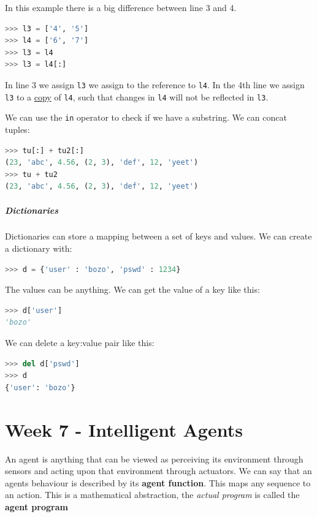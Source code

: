 \documentclass{article}
\begin{document}
In this example there is a big difference between line 3 and 4.
\begin{lstlisting}[inputencoding=utf8/latin1,basicstyle=\ttfamily,
language=python, keywordstyle=\color{blue}\bfseries, rulecolor=\color{black}]
>>> l3 = ['4', '5']
>>> l4 = ['6', '7']
>>> l3 = l4
>>> l3 = l4[:]
\end{lstlisting}
In line 3 we assign \texttt{l3} we assign to the reference to \texttt{l4}. In
the 4th line we assign \texttt{l3} to a \underline{copy} of \texttt{l4}, such
that changes in \texttt{l4} will not be reflected in \texttt{l3}.

We can use the \texttt{in} operator to check if we have a substring. We can
concat tuples:
\begin{lstlisting}[inputencoding=utf8/latin1,basicstyle=\ttfamily,
language=python, keywordstyle=\color{blue}\bfseries, rulecolor=\color{black}]
>>> tu[:] + tu2[:]
(23, 'abc', 4.56, (2, 3), 'def', 12, 'yeet')
>>> tu + tu2
(23, 'abc', 4.56, (2, 3), 'def', 12, 'yeet')
\end{lstlisting}

\subparagraph{Dictionaries}
Dictionaries can store a mapping between a set of keys and values. We can
create a dictionary with:
\begin{lstlisting}[inputencoding=utf8/latin1,basicstyle=\ttfamily,
language=python, keywordstyle=\color{blue}\bfseries, rulecolor=\color{black}]
>>> d = {'user' : 'bozo', 'pswd' : 1234}
\end{lstlisting}
The values can be anything. We can get the value of a key like this:
\begin{lstlisting}[inputencoding=utf8/latin1,basicstyle=\ttfamily,
language=python, keywordstyle=\color{blue}\bfseries, rulecolor=\color{black}]
>>> d['user']
'bozo'
\end{lstlisting}
We can delete a key:value pair like this:
\begin{lstlisting}[inputencoding=utf8/latin1,basicstyle=\ttfamily,
language=python, keywordstyle=\color{blue}\bfseries, rulecolor=\color{black}]
>>> del d['pswd']
>>> d
{'user': 'bozo'}
\end{lstlisting}

\newpage

\section{Week 7 - Intelligent Agents}
An agent is anything that can be viewed as perceiving its environment through
sensors and acting upon that environment through actuators. We can say that
an agents behaviour is described by its \textbf{agent function}. This maps any sequence
to an action. This is a mathematical abstraction, the \textit{actual program} is
called the \textbf{agent program}
\end{document}
